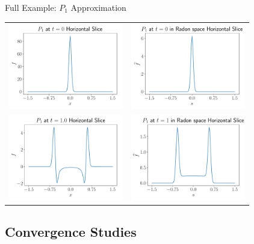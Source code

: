 \documentclass{beamer}
\begin{document}
\begin{frame}{Full Example: $P_1$ Approximation}
    \centering
    \begin{tabular}{>{\centering\arraybackslash}m{5cm} >{\centering\arraybackslash}m{5cm}}
      \includegraphics[width=5cm]{figures/Physical_inital_p1_slice.pdf} &
      \includegraphics[width=5cm]{figures/radon_inital_p1_slice.pdf} \\
      \includegraphics[width=5cm]{figures/Physical_final_p1_slice.pdf}  &
      \includegraphics[width=5cm]{figures/radon_final_p1_slice.pdf}
    \end{tabular}
\end{frame}

\subsection{Convergence Studies}
\end{document}
